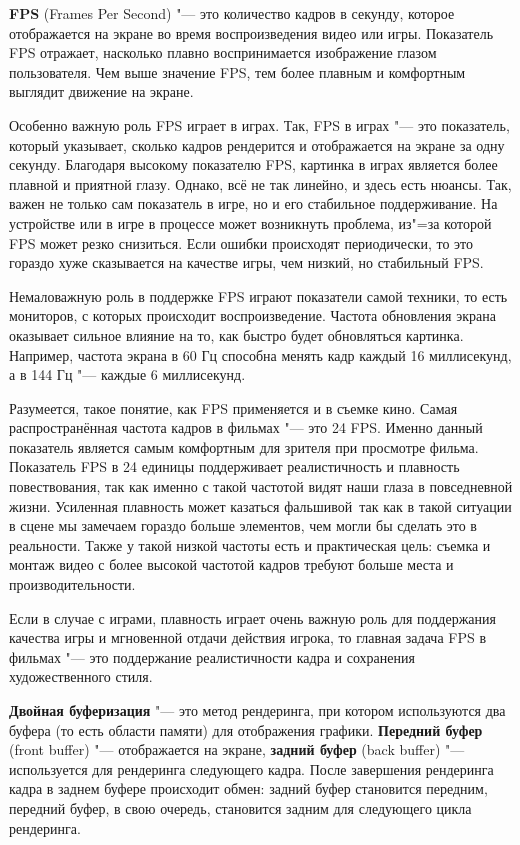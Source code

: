\textbf{FPS} (Frames Per Second) "--- это количество кадров в секунду, которое отображается на экране во время воспроизведения видео или игры. Показатель FPS отражает, насколько плавно воспринимается изображение глазом пользователя. Чем выше значение FPS, тем более плавным и комфортным выглядит движение на экране.

Особенно важную роль FPS играет в играх. Так, FPS в играх "--- это показатель, который указывает, сколько кадров рендерится и отображается на экране за одну секунду. Благодаря высокому показателю FPS, картинка в играх является более плавной и приятной глазу. Однако, всё не так линейно, и здесь есть нюансы. Так, важен не только сам показатель в игре, но и его стабильное поддерживание. На устройстве или в игре в процессе может возникнуть проблема, из"=за которой FPS может резко снизиться. Если ошибки происходят периодически, то это гораздо хуже сказывается на качестве игры, чем низкий, но стабильный FPS.

Немаловажную роль в поддержке FPS играют показатели самой техники, то есть мониторов, с которых происходит воспроизведение. Частота обновления экрана оказывает сильное влияние на то, как быстро будет обновляться картинка. Например, частота экрана в 60 Гц способна менять кадр каждый 16 миллисекунд, а в 144 Гц "--- каждые 6 миллисекунд.

Разумеется, такое понятие, как FPS применяется и в съемке кино. Самая распространённая частота кадров в фильмах "--- это 24 FPS. Именно данный показатель является самым комфортным для зрителя при просмотре фильма. Показатель FPS в 24 единицы поддерживает реалистичность и плавность повествования, так как именно с такой частотой видят наши глаза в повседневной жизни. Усиленная плавность может казаться \flqq фальшивой\frqq\, так как в такой ситуации в сцене мы замечаем гораздо больше элементов, чем могли бы сделать это в реальности. Также у такой низкой частоты есть и практическая цель: съемка и монтаж видео с более высокой частотой кадров требуют больше места и производительности.

Если в случае с играми, плавность играет очень важную роль для поддержания качества игры и мгновенной отдачи действия игрока, то главная задача FPS в фильмах "--- это поддержание реалистичности кадра и сохранения художественного стиля.

\textbf{Двойная буферизация} "--- это метод рендеринга, при котором используются два буфера (то есть области памяти) для отображения графики. \textbf{Передний буфер} (front buffer) "--- отображается на экране, \textbf{задний буфер} (back buffer) "--- используется для рендеринга следующего кадра. После завершения рендеринга кадра в заднем буфере происходит обмен: задний буфер становится передним, передний буфер, в свою очередь, становится задним для следующего цикла рендеринга.


